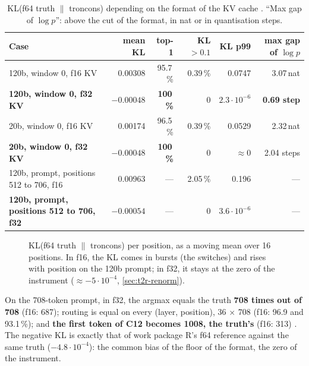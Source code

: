 \begin{table}[ht]
\centering\small
\caption[f16 against f32 KV cache, against the f64 truth]{KL(f64 truth $\|$ troncons) depending on the format of the KV cache \mes. \enquote{Max gap of $\log p$}: above the cut of the format, in nat or in quantisation steps.}
\label{tab:t2r-kv}
\setlength{\tabcolsep}{3pt}
\begin{tabular}{@{}lrrrrr@{}}
\toprule
Case & mean KL & top-1 & KL $> 0.1$ & KL p99 & max gap of $\log p$ \\
\midrule
120b, window 0, f16 KV & 0.00308 & 95.7\,\% & 0.39\,\% & 0.0747 & 3.07\,nat \\
\textbf{120b, window 0, f32 KV} & $\mathbf{-0.00048}$ & \textbf{100\,\%} & 0 & $2.3\cdot10^{-6}$ & \textbf{0.69 step} \\
20b, window 0, f16 KV & 0.00174 & 96.5\,\% & 0.39\,\% & 0.0529 & 2.32\,nat \\
\textbf{20b, window 0, f32 KV} & $\mathbf{-0.00048}$ & \textbf{100\,\%} & 0 & $\approx 0$ & 2.04 steps \\
120b, prompt, positions 512 to 706, f16 & 0.00963 & --- & 2.05\,\% & 0.196 & --- \\
\textbf{120b, prompt, positions 512 to 706, f32} & $\mathbf{-0.00054}$ & --- & 0 & $3.6\cdot10^{-6}$ & --- \\
\bottomrule
\end{tabular}
\end{table}

\begin{figure}[ht]
\centering
\GrapheRefKv
\caption[KL against the truth, f16 against f32 KV cache]{KL(f64 truth $\|$ troncons) per position, as a moving mean over 16 positions. In f16, the KL comes in bursts (the switches) and rises with position on the 120b prompt; in f32, it stays at the zero of the instrument ($\approx -5\cdot10^{-4}$, \cref{sec:t2r-renorm}).}
\label{fig:t2r-kv}
\end{figure}

On the 708-token prompt, in f32, the argmax equals the truth \textbf{708 times out of 708} (f16: 687); routing is equal on every (layer, position), 36 $\times$ 708 (f16: 96.9 and 93.1\,\%); and \textbf{the first token of C12 becomes 1008, the truth's} (f16: 313) \mes. The negative KL is exactly that of work package R's f64 reference against the same truth ($-4.8\cdot10^{-4}$): the common bias of the floor of the format, the zero of the instrument.

